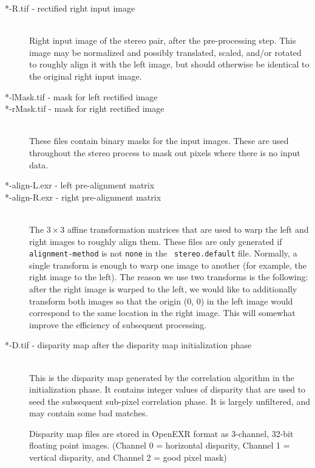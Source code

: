\begin{description}
\item[*-R.tif - \textnormal{rectified right input image}] \hfill \\
  Right input image of the stereo pair, after the pre-processing
  step.  This image may be normalized and possibly
    translated, scaled, and/or rotated to roughly align it with the left
    image, but should otherwise be identical to the original right
  input image.

\item[*-lMask.tif \textnormal{- mask for left rectified image}]
\item[*-rMask.tif \textnormal{- mask for right rectified image}] \hfill \\
  These files contain binary masks for the input images.  These are
  used throughout the stereo process to mask out pixels where there is
  no input data.

\item[*-align-L.exr \textnormal{- left pre-alignment matrix}]
\item[*-align-R.exr \textnormal{- right pre-alignment matrix}] \hfill \\
 The $3 \times 3$ affine transformation matrices that are used to warp
 the left and right images to roughly align them. These files are only
 generated if \texttt{alignment-method} is not \texttt{none} in the {\tt
 stereo.default} file. Normally, a single transform is enough to warp one
 image to another (for example, the right image to the left). The reason
 we use two transforms is the following: after the right image is warped
 to the left, we would like to additionally transform both images so that
 the origin (0, 0) in the left image would correspond to the same
 location in the right image. This will somewhat improve the efficiency
 of subsequent processing.

\item[*-D.tif \textnormal{- disparity map after the disparity map initialization phase}] \hfill \\
  This is the disparity map generated by the correlation algorithm in
  the initialization phase.  It contains integer values of disparity
  that are used to seed the subsequent sub-pixel correlation phase.
  It is largely unfiltered, and may contain some bad matches.

  Disparity map files are stored in OpenEXR format as 3-channel,
  32-bit floating point images.  (Channel 0 = horizontal disparity,
  Channel 1 = vertical disparity, and Channel 2 = good pixel mask)


\end{description}
